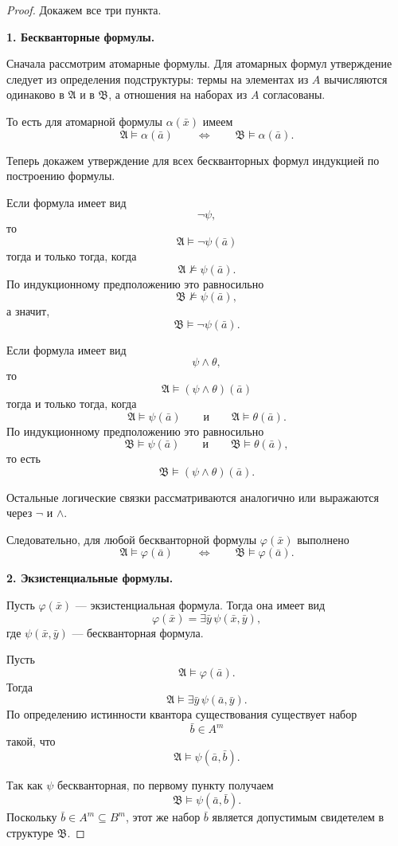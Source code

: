 \documentclass[12pt,a4paper,oneside,openany]{book}
\theoremstyle{definition}
\theoremstyle{plain}
\theoremstyle{remark}
\begin{document}
\begin{proof}
Докажем все три пункта.

\textbf{1. Бескванторные формулы.}

Сначала рассмотрим атомарные формулы. Для атомарных формул утверждение следует из определения подструктуры: термы на элементах из $A$ вычисляются одинаково в $\mathfrak A$ и в $\mathfrak B$, а отношения на наборах из $A$ согласованы.

То есть для атомарной формулы $\alpha(\bar x)$ имеем
\[
\mathfrak A\models\alpha(\bar a)
\qquad
\Longleftrightarrow
\qquad
\mathfrak B\models\alpha(\bar a).
\]

Теперь докажем утверждение для всех бескванторных формул индукцией по построению формулы.

Если формула имеет вид
\[
\neg\psi,
\]
то
\[
\mathfrak A\models\neg\psi(\bar a)
\]
тогда и только тогда, когда
\[
\mathfrak A\not\models\psi(\bar a).
\]
По индукционному предположению это равносильно
\[
\mathfrak B\not\models\psi(\bar a),
\]
а значит,
\[
\mathfrak B\models\neg\psi(\bar a).
\]

Если формула имеет вид
\[
\psi\wedge\theta,
\]
то
\[
\mathfrak A\models(\psi\wedge\theta)(\bar a)
\]
тогда и только тогда, когда
\[
\mathfrak A\models\psi(\bar a)
\qquad\text{и}\qquad
\mathfrak A\models\theta(\bar a).
\]
По индукционному предположению это равносильно
\[
\mathfrak B\models\psi(\bar a)
\qquad\text{и}\qquad
\mathfrak B\models\theta(\bar a),
\]
то есть
\[
\mathfrak B\models(\psi\wedge\theta)(\bar a).
\]

Остальные логические связки рассматриваются аналогично или выражаются через $\neg$ и $\wedge$.

Следовательно, для любой бескванторной формулы $\varphi(\bar x)$ выполнено
\[
\mathfrak A\models\varphi(\bar a)
\qquad
\Longleftrightarrow
\qquad
\mathfrak B\models\varphi(\bar a).
\]

\textbf{2. Экзистенциальные формулы.}

Пусть $\varphi(\bar x)$ — экзистенциальная формула. Тогда она имеет вид
\[
\varphi(\bar x)=\exists \bar y\,\psi(\bar x,\bar y),
\]
где $\psi(\bar x,\bar y)$ — бескванторная формула.

Пусть
\[
\mathfrak A\models\varphi(\bar a).
\]
Тогда
\[
\mathfrak A\models\exists \bar y\,\psi(\bar a,\bar y).
\]
По определению истинности квантора существования существует набор
\[
\bar b\in A^m
\]
такой, что
\[
\mathfrak A\models\psi(\bar a,\bar b).
\]

Так как $\psi$ бескванторная, по первому пункту получаем
\[
\mathfrak B\models\psi(\bar a,\bar b).
\]
Поскольку $\bar b\in A^m\subseteq B^m$, этот же набор $\bar b$ является допустимым свидетелем в структуре $\mathfrak B$.


\end{proof}
\end{document}
